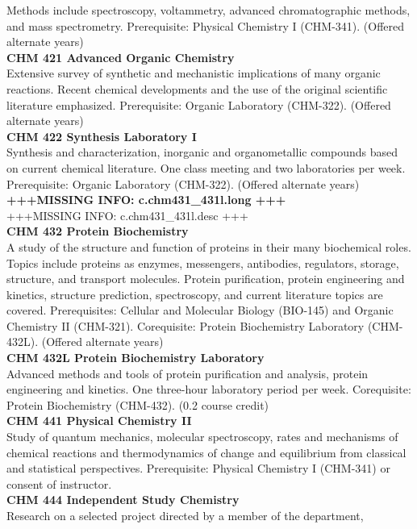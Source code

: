 \documentclass[
  letterpaper,
]{scrbook}
\begin{document}
Methods include spectroscopy, voltammetry, advanced chromatographic
methods, and mass spectrometry. Prerequisite: Physical Chemistry I
(CHM-341). (Offered alternate years)\\
\textbf{CHM 421 Advanced Organic Chemistry}\\
Extensive survey of synthetic and mechanistic implications of many
organic reactions. Recent chemical developments and the use of the
original scientific literature emphasized. Prerequisite: Organic
Laboratory (CHM-322). (Offered alternate years)\\
\textbf{CHM 422 Synthesis Laboratory I}\\
Synthesis and characterization, inorganic and organometallic compounds
based on current chemical literature. One class meeting and two
laboratories per week. Prerequisite: Organic Laboratory (CHM-322).
(Offered alternate years)\\
\textbf{+++MISSING INFO: c.chm431\_431l.long +++}\\
+++MISSING INFO: c.chm431\_431l.desc +++\\
\textbf{CHM 432 Protein Biochemistry}\\
A study of the structure and function of proteins in their many
biochemical roles. Topics include proteins as enzymes, messengers,
antibodies, regulators, storage, structure, and transport molecules.
Protein purification, protein engineering and kinetics, structure
prediction, spectroscopy, and current literature topics are covered.
Prerequisites: Cellular and Molecular Biology (BIO-145) and Organic
Chemistry II (CHM-321). Corequisite: Protein Biochemistry Laboratory
(CHM-432L). (Offered alternate years)\\
\textbf{CHM 432L Protein Biochemistry Laboratory}\\
Advanced methods and tools of protein purification and analysis, protein
engineering and kinetics. One three-hour laboratory period per week.
Corequisite: Protein Biochemistry (CHM-432). (0.2 course credit)\\
\textbf{CHM 441 Physical Chemistry II}\\
Study of quantum mechanics, molecular spectroscopy, rates and mechanisms
of chemical reactions and thermodynamics of change and equilibrium from
classical and statistical perspectives. Prerequisite: Physical Chemistry
I (CHM-341) or consent of instructor.\\
\textbf{CHM 444 Independent Study Chemistry}\\
Research on a selected project directed by a member of the department,
\end{document}
